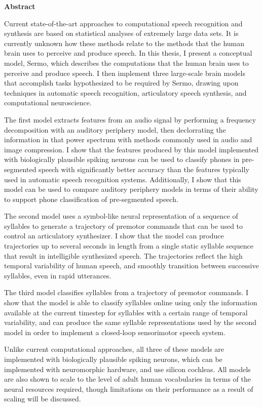 \begin{center}\textbf{Abstract}\end{center}

Current state-of-the-art approaches
to computational
speech recognition and synthesis
are based on statistical analyses
of extremely large data sets.
It is currently unknown how these methods
relate to the methods that the human brain
uses to perceive and produce speech.
In this thesis,
I present a conceptual model,
Sermo,
which describes the computations that
the human brain uses to
perceive and produce speech.
I then implement three large-scale brain models
that accomplish tasks
hypothesized to be required by Sermo,
drawing upon techniques
in automatic speech recognition,
articulatory speech synthesis,
and computational neuroscience.

The first model extracts features
from an audio signal by
performing a frequency decomposition
with an auditory periphery model,
then declorrating the information
in that power spectrum
with methods commonly used in
audio and image compression.
I show that the features produced
by this model implemented
with biologically plausible spiking neurons
can be used to classify phones in
pre-segmented speech with significantly
better accuracy than the features
typically used in
automatic speech recognition systems.
Additionally, I show that this model
can be used to compare auditory periphery models
in terms of their ability to
support phone classification of pre-segmented speech.

The second model
uses a symbol-like neural representation
of a sequence of syllables
to generate a trajectory of premotor commands
that can be used to control
an articulatory synthesizer.
I show that the model
can produce trajectories
up to several seconds in length
from a single static syllable sequence
that result in
intelligible synthesized speech.
The trajectories reflect the
high temporal variability
of human speech,
and smoothly transition between
successive syllables,
even in rapid utterances.

The third model
classifies syllables
from a trajectory of premotor commands.
I show that the model is able to
classify syllables online
using only the information available
at the current timestep
for syllables with a certain range
of temporal variability,
and can produce the same
syllable representations
used by the second model
in order to implement
a closed-loop sensorimotor speech system.

Unlike current computational approaches,
all three of these models are implemented
with biologically plausible spiking neurons,
which can be implemented with neuromorphic hardware,
and use silicon cochleas.
All models are also shown to scale
to the level of adult human vocabularies
in terms of the neural resources required,
though limitations on their performance
as a result of scaling will be discussed.

\cleardoublepage
